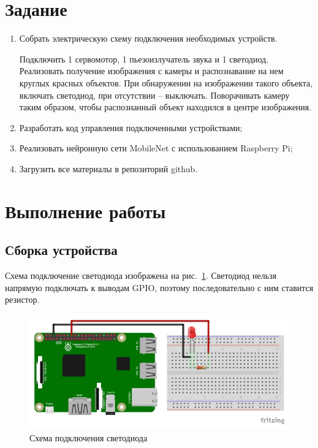 \documentclass[a4paper,14pt]{article}
\begin{document}
    
    \tableofcontents
    \pagebreak


    \section{Задание}

    \begin{enumerate}
        \item Собрать электрическую схему подключения необходимых устройств.

        Подключить 1 сервомотор, 1 пьезоизлучатель звука и 1 светодиод.
        Реализовать получение изображения с камеры и распознавание на нем круглых красных объектов.
        При обнаружении на изображении такого объекта, включать светодиод, при отсутствии – выключать.
        Поворачивать камеру таким образом, чтобы распознанный объект находился в центре изображения.

        \item Разработать код управления подключенными устройствами;
        \item Реализовать нейронную сети MobileNet с использованием Raspberry Pi;
        \item Загрузить все материалы в репозиторий github.
    \end{enumerate}


    \section{Выполнение работы}

    \subsection{Сборка устройства}

    Схема подключение светодиода изображена на рис.~\ref{fig:led}.
    Светодиод нельзя напрямую подключать к выводам GPIO, поэтому последовательно с ним ставится резистор.

    \begin{figure}[H]
        \centering
        \includegraphics[width=0.95\linewidth]{schemas/led_bb}
        \caption{Схема подключения светодиода}
        \label{fig:led}
    \end{figure}
\end{document}
